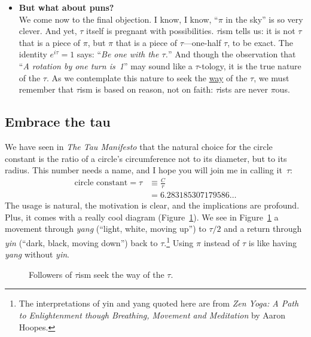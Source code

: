 {\begin{itemize}
  \item \textbf{But what about puns?} \\ We come now to the final objection. I know, I know, ``$\pi$ in the sky'' is so very clever. And yet, $\tau$ itself is pregnant with possibilities. $\tau$ism tells us: it is not $\tau$ that is a piece of $\pi$, but $\pi$ that is a piece of $\tau$---one-half $\tau$, to be exact. The identity $e^{i\tau} = 1$ says: ``\emph{Be one with the $\tau$.}'' And though the observation that ``\emph{A rotation by one turn is~1}'' may sound like a $\tau$-tology, it is the true nature of the $\tau$. As we contemplate this nature to seek the \href{https://en.wikipedia.org/wiki/Tao}{way} of the $\tau$, we must remember that $\tau$ism is based on reason, not on faith: $\tau$ists are never $\pi$ous.

\end{itemize}


  \subsection{Embrace the tau} %
  \label{sec:embrace_the_tau}

We have seen in \emph{The Tau Manifesto} that the natural choice for the circle constant is the ratio of a circle's circumference not to its diameter, but to its radius. This number needs a name, and I hope you will join me in calling it~$\tau$:
\[
\begin{split}
\mbox{circle constant} = \tau & \equiv \frac{C}{r} \\
                              & = 6.283185307179586\ldots
\end{split}
\]
The usage is natural, the motivation is clear, and the implications are profound. Plus, it comes with a really cool diagram (Figure~\ref{fig:tauism}). We see in Figure~\ref{fig:tauism} a movement through \emph{yang} (``light, white, moving up'') to $\tau/2$ and a return through \emph{yin} (``dark, black, moving down'') back to $\tau$.\footnote{The interpretations of yin and yang quoted here are from \emph{Zen Yoga: A Path to Enlightenment though Breathing, Movement and Meditation} by Aaron Hoopes.} Using $\pi$ instead of $\tau$ is like having \emph{yang} without \emph{yin}.

\begin{figure}
\begin{center}
\end{center}
\caption{Followers of $\tau$ism seek the way of the $\tau$.\label{fig:tauism}}
\end{figure}

}
